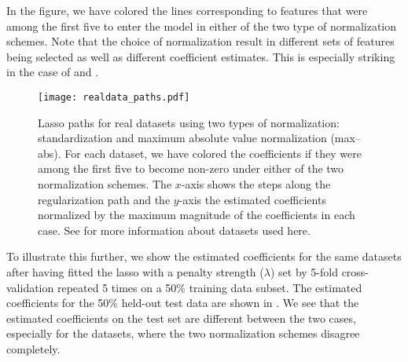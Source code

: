 In the figure, we have colored the lines corresponding to features that were among the
first five to enter the model in either of the two type of normalization schemes. Note that
the choice of normalization result in different sets of features being selected as well as
different coefficient estimates. This is especially striking in the case of
 and .

\begin{figure}[bpt]
  \centering
  \texttt{[image: realdata\_paths.pdf]}
  \caption{%
    Lasso paths for real datasets using two types of normalization:
    standardization and maximum absolute value normalization (max--abs). For
    each dataset, we have colored the coefficients if they were among the first
    five to become non-zero under either of the two normalization schemes.
    The \(x\)-axis shows the steps along the regularization path and
    the \(y\)-axis the estimated coefficients normalized by the
    maximum magnitude of the coefficients in each case. See
     for more information about datasets used here.
  }
  \label{fig:realdata-paths}
\end{figure}

To illustrate this further, we show the estimated coefficients for the same datasets after
having fitted the lasso with a penalty strength (\(\lambda\)) set by 5-fold
cross-validation repeated 5 times on a 50\% training data subset. The estimated
coefficients for the 50\% held-out test data are shown in . We
see that the estimated coefficients on the test set are different between the two cases,
especially for the  datasets, where the two normalization schemes disagree
completely.

